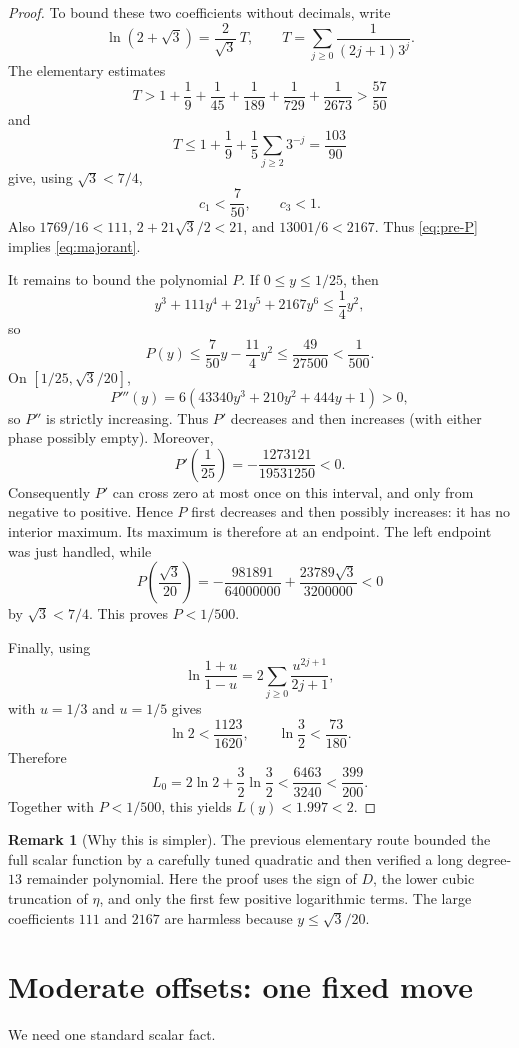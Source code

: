 \documentclass[11pt]{article}
\theoremstyle{definition}
\newtheorem{remark}[theorem]{Remark}
\newcommand{\1}{\mathbf{1}}
\begin{document}
\begin{proof}
To bound these two coefficients without decimals, write
\[
\ln(2+\sqrt3)=\frac{2}{\sqrt3}\,T,
\qquad
T=\sum_{j\ge0}\frac{1}{(2j+1)3^j}.
\]
The elementary estimates
\[
T>1+\frac19+\frac1{45}+\frac1{189}+\frac1{729}+\frac1{2673}>\frac{57}{50}
\]
and
\[
T\le1+\frac19+\frac15\sum_{j\ge2}3^{-j}=\frac{103}{90}
\]
give, using $\sqrt3<7/4$,
\[
c_1<\frac7{50},
\qquad
c_3<1.
\]
Also $1769/16<111$, $2+21\sqrt3/2<21$, and $13001/6<2167$.  Thus \eqref{eq:pre-P} implies \eqref{eq:majorant}.

It remains to bound the polynomial $P$.  If $0\le y\le1/25$, then
\[
y^3+111y^4+21y^5+2167y^6\le\frac14y^2,
\]
so
\[
P(y)\le\frac7{50}y-\frac{11}{4}y^2
\le\frac{49}{27500}<\frac1{500}.
\]
On $[1/25,\sqrt3/20]$,
\[
P'''(y)=6(43340y^3+210y^2+444y+1)>0,
\]
so $P''$ is strictly increasing.  Thus $P'$ decreases and then increases (with either phase possibly empty).  Moreover,
\[
P'\left(\frac1{25}\right)
=-\frac{1273121}{19531250}<0.
\]
Consequently $P'$ can cross zero at most once on this interval, and only from negative to positive.  Hence $P$ first decreases and then possibly increases: it has no interior maximum.  Its maximum is therefore at an endpoint.  The left endpoint was just handled, while
\[
P\left(\frac{\sqrt3}{20}\right)
=-\frac{981891}{64000000}
 +\frac{23789\sqrt3}{3200000}<0
\]
by $\sqrt3<7/4$.  This proves $P<1/500$.

Finally, using
\[
\ln\frac{1+u}{1-u}=2\sum_{j\ge0}\frac{u^{2j+1}}{2j+1},
\]
with $u=1/3$ and $u=1/5$ gives
\[
\ln2<\frac{1123}{1620},
\qquad
\ln\frac32<\frac{73}{180}.
\]
Therefore
\[
L_0=2\ln2+\frac32\ln\frac32
<\frac{6463}{3240}
<\frac{399}{200}.
\]
Together with $P<1/500$, this yields $L(y)<1.997<2$.
\end{proof}

\begin{remark}[Why this is simpler]
The previous elementary route bounded the full scalar function by a carefully tuned quadratic and then verified a long degree-$13$ remainder polynomial.  Here the proof uses the sign of $D$, the lower cubic truncation of $\eta$, and only the first few positive logarithmic terms.  The large coefficients $111$ and $2167$ are harmless because $y\le\sqrt3/20$.
\end{remark}

\section{Moderate offsets: one fixed move}

We need one standard scalar fact.
\end{document}
